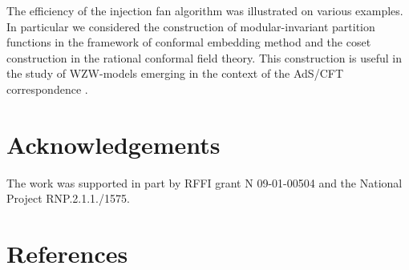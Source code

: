 \documentclass[12pt]{iopart}
\theoremstyle{definition}
\begin{document}
The efficiency of the injection fan algorithm was illustrated on various examples.
In particular we considered the construction of modular-invariant partition functions
in the framework of conformal embedding method and the coset construction in the rational conformal field theory.
This construction is useful in the study of WZW-models
emerging in the context of the AdS/CFT correspondence \cite{Maldacena:2000hw,Maldacena:2000kv,Maldacena:2001km}.

\section{Acknowledgements}
The work was supported in
part by RFFI grant N 09-01-00504 and the National Project RNP.2.1.1./1575.

\section*{References}
{}

\end{document}
